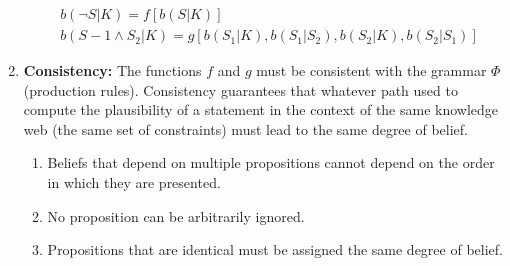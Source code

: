 \documentclass[
  letterpaper,
  12pt,
  british]{tufte-book}
\theoremstyle{plain}
\theoremstyle{definition}
\theoremstyle{plain}
\theoremstyle{remark}
\begin{document}
\begin{enumerate}
  \begin{align}
          &b(\neg S|K) = f[b(S|K)] \tag{NOT}\\
          &b(S-1 \land S_2 | K) = g[b(S_1|K), b(S_1|S_2), b(S_2|K), b(S_2|S_1)] \tag{AND}
  \end{align}
\item
  \textbf{Consistency:} The functions \(f\) and \(g\) must be consistent
  with the grammar \(\Phi\) (production rules). Consistency guarantees
  that whatever path used to compute the plausibility of a statement in
  the context of the same knowledge web (the same set of constraints)
  must lead to the same degree of belief.

  \begin{enumerate}
  \def\labelenumii{(\alph{enumii})}
  \item
    Beliefs that depend on multiple propositions cannot depend on the
    order in which they are
    presented.\protect\hypertarget{axiom:order}{}{}
  \item
    No proposition can be arbitrarily ignored.
  \item
    Propositions that are identical must be assigned the same degree of
    belief.
  \end{enumerate}
\end{enumerate}
\end{document}
